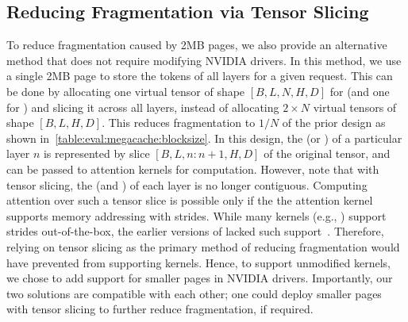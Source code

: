 \subsection{Reducing Fragmentation via Tensor Slicing}
To reduce fragmentation caused by 2MB pages, we also provide an alternative method that does not require modifying  NVIDIA drivers. In this method, we use a single 2MB page to store the \kvcache tokens of all layers for a given request. This can be done by allocating one virtual tensor of shape $[B, L, N, H, D]$ for \kcache (and one for \vcache) and slicing it across all layers, instead of allocating $2\times N$ virtual tensors of shape $[B, L, H, D]$. This reduces fragmentation to $1/N$ of the prior design as shown in~\autoref{table:eval:megacache:blocksize}. In this design, the \kcache (or \vcache) of a particular layer $n$ is represented by slice $[B, L, n:n+1, H, D]$ of the original tensor, and can be passed to attention kernels for computation. However, note that with tensor slicing, the \kcache (and \vcache) of each layer is no longer contiguous. Computing attention over such a tensor slice is possible only if the the attention kernel supports memory addressing with strides. While many kernels (e.g., \flashattention) support strides out-of-the-box, the earlier versions of \flashinfer lacked such support~\cite{fi-strides}. Therefore, relying on tensor slicing as the primary method of reducing fragmentation would have prevented \sysname from supporting \flashinfer kernels. Hence, to support unmodified \flashinfer kernels, we chose to add support for smaller pages in NVIDIA drivers. Importantly, our two solutions are compatible with each other; one could deploy smaller pages with tensor slicing to further reduce fragmentation, if required.






